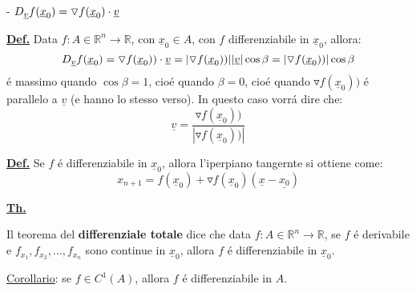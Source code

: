 \documentclass[a4paper,10pt]{article} %
\renewcommand{\b}[1]{%
    {\textbf{#1}}}
\renewcommand{\v}[1]{%
    {\underline{#1}}}
\newcommand{\ldef}[1]{%
    {\smallbreak\par\tiny\textbf{\underline{Def.}} {#1} \smallbreak}}
\newcommand{\ltheorem}[1]{%
    {\smallbreak\par\tiny\textbf{\underline{Th.}} {#1} \smallbreak\par}}
\newcommand{\ldim}[1]{%
    {\smallbreak\par\tiny\emph{\textbf{Dimostrazione}} {#1} \par}}
\renewcommand{\ldim}[1]{{}}
\begin{document}
\begin{multicols}{6}
{{    }

    - $ D_\v{v} f(\v{x}_0) = \triangledown f(\v{x}_0) \cdot \v{v} $
    \ldim{
        Pongo $ \v{h} = t\v{v})$, $ \implies f(x_0 + tv) - f(x_0) = \triangledown f(x_0) \cdot tv + o(|t|)$
        Dividendo entrambi i membri per $t \implies D_\v{v} f(x_0) = \triangledown f(x_0) \cdot v, 
        \forall v \in \mathbb{R}^n $.
        (In pratica ho dimostrato che la derivata direzionale esiste sempre, e che quindi la $f$ é derivabile direzionalmente)
    }
}


\ldef{
    Data $f:A\in\mathbb{R}^n\rightarrow\mathbb{R}$, con $\v{x}_0 \in A$, con $f$ 
    differenziabile in $\v{x}_0$, allora: 
    \[
        D_\v{v} f(\v{x}_0) = \triangledown f(\v{x}_0)) \cdot \v{v} = 
        | \triangledown f(\v{x}_0)) | |\v{v}| \cos\beta = | \triangledown f(\v{x}_0)) | \cos\beta
    \]
    é massimo quando $ \cos\beta = 1$, cioé quando $ \beta = 0$, cioé quando 
    $ \triangledown f(\v{x}_0)) $ é parallelo a $\v{v}$ (e hanno lo stesso verso).
    In questo caso vorrá dire che:
    \[
        \v{v} = \frac{\triangledown f(\v{x}_0))} { |\triangledown f(\v{x}_0))|}
    \]
}



\ldef{
    Se $f$ é differenziabile in $\v{x}_0$, allora l'iperpiano tangernte si
    ottiene come:
    \[
        x_{n+1} = f(\v{x}_0) + \triangledown f(\v{x}_0) (\v{x} - \v{x_0})
    \]
    \ldim{
        Sapevamo che:
        \[
            f(\v{x}_0) - \v{h}) = f(\v{x}_0) + \triangledown f(\v{x}_0) \cdot
            \v{h} + o(|h|) 
        \]
        Tuttavia se poniamo $ \v{h} = (\v{x} - \v{x}_0)$:
        \[
            f(\v{x}) = f(\v{x}_0) + \triangledown f(\v{x}_0) (\v{x} - \v{x}_0 )
            + o(| \v{x} - \v{x}_0 |)
        \]
    }
}


\ltheorem{ 
    Il teorema del \b{differenziale totale} dice che data
    $f:A\in\mathbb{R}^n\rightarrow\mathbb{R}$, se $f$ é derivabile e $f_{x_1},
    f_{x_2}, \dots, f_{x_n}$ sono continue in $\v{x}_0$, allora $f$ é
    differenziabile in $\v{x}_0$.

    \v{Corollario}: se $f \in C^1 (A)$, allora $f$ é differenziabile in $A$.



}
\end{multicols}
\end{document}
